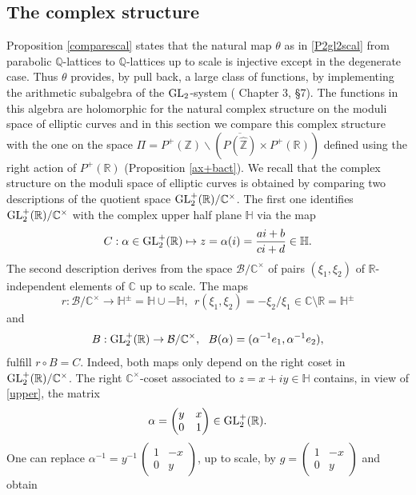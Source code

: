 \documentclass[graybox, envcountsect%
]{svmult}
\def\GL{{\rm GL}}
\def\C{{\mathbb C}}
\def\Q{{\mathbb Q}}
\def\R{{\mathbb R}}
\def\Z{{\mathbb Z}}
\def\H{{\mathbb H}}
\def\cB{{\mathcal B}}
\begin{document}
\subsection{The complex structure}\label{subsec:6.6}


Proposition \ref{comparescal} states that
 	the natural map $\theta$ as in \eqref{P2gl2scal} from parabolic $\Q$-lattices to $\Q$-lattices up to scale
 	is injective except in the degenerate case. Thus  $\theta$  provides, by pull back, a large class of functions, by implementing the arithmetic subalgebra of the $\GL_2$-system (\!\cite{cmbook} Chapter 3, \S 7). The functions in this  algebra are holomorphic for  the natural complex structure on the moduli space of elliptic curves and in this section we compare this complex structure 
with the one on the space $\Pi=P^+(\Z)\backslash (\overline{P(\hat \Z)}\times P^+(\R))$  defined using the right action of $P^+(\R)$ (Proposition \ref{ax+bact}).\newline
 We recall that the complex structure on the moduli space of elliptic curves is obtained by comparing two descriptions of the quotient space $\GL_2^+ (\R)/\C^\times$. The first one identifies $\GL_2^+ (\R)/\C^\times$ with the complex upper half plane $\H$ via the map
\begin{equation}\label{upper}
C:\alpha\in \GL_2^+ (\R)\mapsto z=\alpha(i)=\frac{ai+b}{ci+d}\in \H.
\end{equation}
The second description derives  from the space $\cB/\C^\times$ of pairs $(\xi_1,\xi_2)$ of $\R$-independent elements of $\C$ up to scale. The maps 
\begin{equation}\label{upperbis}
r:\cB/\C^\times\to\H^\pm =\H\cup -\H, \ \ r(\xi_1,\xi_2)= -\xi_2/\xi_1\in \C\setminus \R=\H^\pm
\end{equation}
and
\begin{equation}\label{upper1}
B: \GL_2^+ (\R)\to \cB/\C^\times, \ \ B(\alpha)= (\alpha^{-1}e_1,\alpha^{-1}e_2), 
\end{equation}
fulfill $r\circ B=C$. Indeed, both maps only depend on the right coset in $\GL_2^+ (\R)/\C^\times$. The right $\C^\times$-coset associated to
$z=x+i y\in \H$ contains, in view of \eqref{upper},  the matrix $$\alpha= \begin{pmatrix} y &x \\
0 &1
\end{pmatrix} \in \GL_2^+ (\R).$$ One can replace 
$\alpha^{-1}= y^{-1}\,\begin{pmatrix} 1 &-x \\
0 &y
\end{pmatrix}$, up to scale, by $g=\begin{pmatrix} 1 &-x \\
0 &y
\end{pmatrix}$ and obtain  
\end{document}

